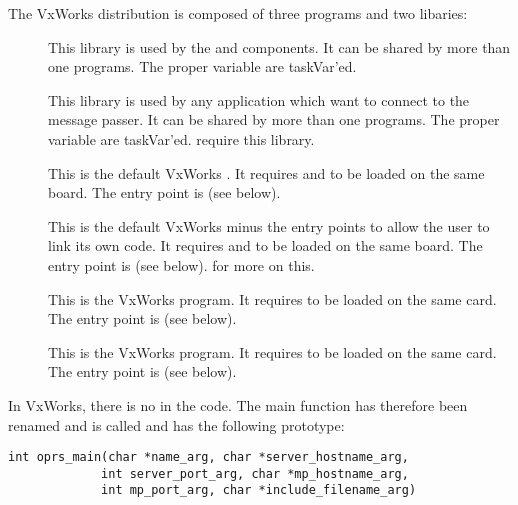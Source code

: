 The VxWorks distribution is composed of three programs and two libaries:

\begin{description}

\item [] This library is used by the  and
 components. It can be shared by more than one programs. The
proper variable are taskVar'ed.

\item [] This library is used by any application which want
to connect to the message passer. It can be shared by more than one
programs. The proper variable are taskVar'ed.  require this
library. 

\item [] This is the default VxWorks \CPK{}. It requires
 and  to be loaded on the same board. The
entry point is  (see below). 

\item [] This is the default VxWorks \CPK{} minus the
entry points to allow the user to link its own code. It requires
 and  to be loaded on the same board. The
entry point is  (see below).  for more on this.

\item [] This is the VxWorks \MP{} program.  It requires
 to be loaded on the same card. The entry point is
 (see below).

\item [] This is the VxWorks  program.  It
requires  to be loaded on the same card. The entry point is
 (see below).


\end{description}

In VxWorks, there is no  in the code. The \COPRS{} main function has
therefore been renamed and is called  and has the following
prototype:

\begin{verbatim}
int oprs_main(char *name_arg, char *server_hostname_arg, 
             int server_port_arg, char *mp_hostname_arg, 
             int mp_port_arg, char *include_filename_arg)
\end{verbatim}

